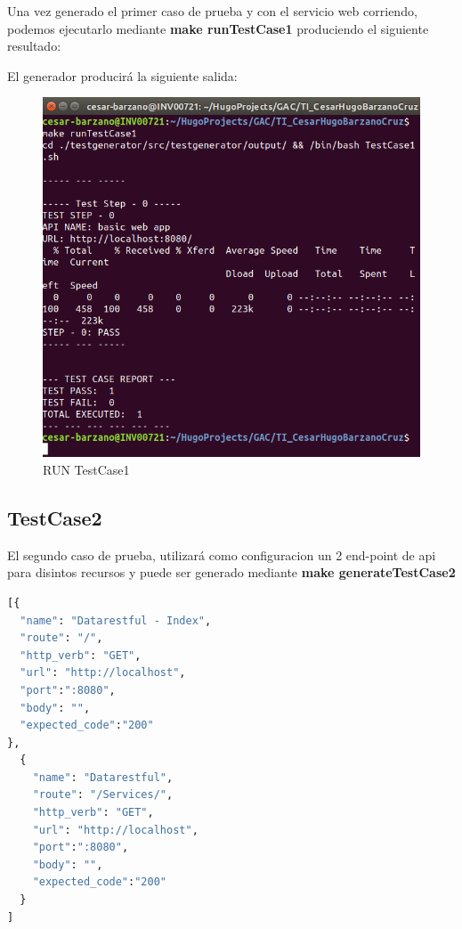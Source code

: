 \documentclass[a4paper,11pt]{book}
\begin{document}
Una vez generado el primer caso de prueba y con el servicio web corriendo, podemos ejecutarlo mediante \textbf{make runTestCase1} produciendo el siguiente resultado:

El generador producirá la siguiente salida:
\begin{figure}[H]  
\centering 
\includegraphics[scale=0.35]{imagenes/TestCase1_2.png}
\caption{ RUN TestCase1 }  
\end{figure} 


\subsection*{TestCase2}

El segundo caso de prueba, utilizará como configuracion un 2 end-point de api para disintos recursos y puede ser generado mediante \textbf{make generateTestCase2 }

 \begin{lstlisting}[language=python,caption={ TestCase2.json  }]
[{
  "name": "Datarestful - Index",
  "route": "/",
  "http_verb": "GET",
  "url": "http://localhost",
  "port":":8080",
  "body": "",
  "expected_code":"200"
},
  {
    "name": "Datarestful",
    "route": "/Services/",
    "http_verb": "GET",
    "url": "http://localhost",
    "port":":8080",
    "body": "",
    "expected_code":"200"
  }
]


\end{lstlisting}
\end{document}
